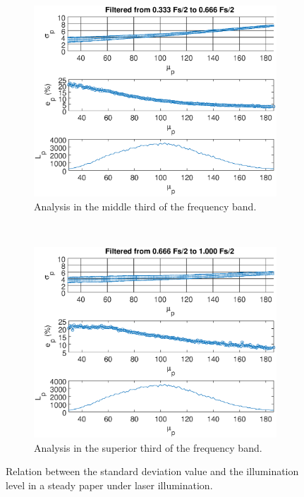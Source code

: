 \documentclass[review]{elsarticle}
\begin{document}
\begin{figure}[h!]
    ~\\ 
    \begin{subfigure}[b]{0.475\textwidth}
        \includegraphics[width=\textwidth]{stdy_curve.eps}
	\caption{Analysis in the middle third of the frequency band.}
        \label{fig:illlevel_stdy}
    \end{subfigure}
  ~
    \begin{subfigure}[b]{0.475\textwidth}
        \includegraphics[width=\textwidth]{stdz_curve.eps}
	\caption{Analysis in the superior third of the frequency band.}
        \label{fig:illlevel_stdz}
    \end{subfigure}
    
    \caption{Relation between the standard deviation value and the illumination level in a steady paper under laser illumination.}
    \label{fig:papelilllevel}
\end{figure}
\end{document}
